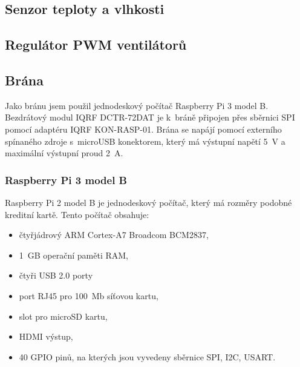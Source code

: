 \documentclass[12pt,a4paper]{article}
\begin{document}
\newpage

\subsection{Senzor teploty a vlhkosti}

\subsection{Regulátor PWM ventilátorů}

\subsection{Brána}

Jako bránu jsem použil jednodeskový počítač Raspberry Pi 3 model B. Bezdrátový modul IQRF DCTR-72DAT je k~bráně připojen přes sběrnici SPI pomocí adaptéru IQRF KON-RASP-01. Brána se napájí pomocí externího spínaného zdroje s~microUSB konektorem, který má výstupní napětí 5~V a maximální výstupní proud 2~A.

\subsubsection{Raspberry Pi 3 model B}

Raspberry Pi 2 model B je jednodeskový počítač, který má rozměry podobné kreditní kartě. Tento počítač obsahuje:

\begin{itemize}
  \item čtyřjádrový ARM Cortex-A7 Broadcom BCM2837,
  \item 1~GB operační paměti RAM,
  \item čtyři USB 2.0 porty
  \item port RJ45 pro 100~Mb síťovou kartu,
  \item slot pro microSD kartu,
  \item HDMI výstup,
  \item 40 GPIO pinů, na kterých jsou vyvedeny sběrnice SPI, I2C, USART.
\end{itemize}
\end{document}
